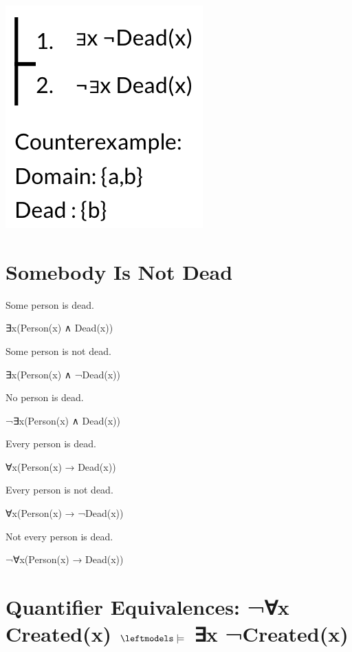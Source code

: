 \documentclass[12pt]{extarticle}
\begin{document}
\begin{multicols*}{3}
\begin{center}
\includegraphics[scale=0.3]{img/unit_605_counterexample.png}
\end{center}
 
 
\section{Somebody Is Not Dead}
 
Some person is dead.
 
\hspace{5mm} ∃x(Person(x) ∧ Dead(x))
 
Some person is not dead.
 
\hspace{5mm} ∃x(Person(x) ∧ ¬Dead(x))
 
No person is dead.
 
\hspace{5mm} ¬∃x(Person(x) ∧ Dead(x))
 
Every person is dead.
 
\hspace{5mm} ∀x(Person(x) → Dead(x))
 
Every person is not dead.
 
\hspace{5mm} ∀x(Person(x) → ¬Dead(x))
 
Not every person is dead.
 
\hspace{5mm} ¬∀x(Person(x) → Dead(x))
 
 
 
\section{Quantifier Equivalences: ¬∀x Created(x) $\leftmodels\models$ ∃x ¬Created(x)}
 

\end{multicols*}
\end{document}

